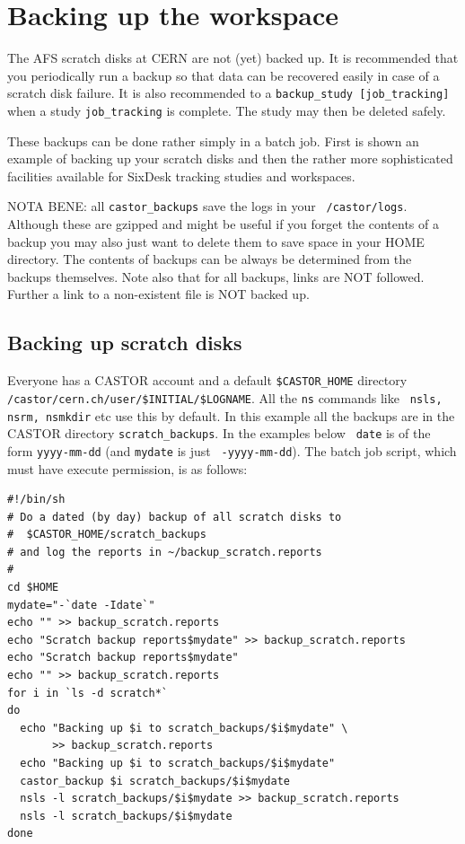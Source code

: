\documentclass{cernatsnote}
\begin{document}
\section{Backing up the workspace}
\label{sec:backup}
The AFS scratch disks at CERN are not (yet) backed up.  It is recommended that
you periodically run a backup so that data can be recovered easily in case of a
scratch disk failure. It is also recommended to a {\tt backup\_study
[job\_tracking]} when a study {\tt job\_tracking} is complete.
The study may then be deleted safely.

These backups can be done rather simply in a batch job. First is shown an
example of backing up your scratch disks and then the rather more sophisticated
facilities available for SixDesk tracking studies and workspaces.

NOTA BENE: all {\tt castor\_backups} save the logs in your {\tt ~/castor/logs}.
Although these are gzipped and might be useful if you forget the contents of a
backup you may also just want to delete them to save space in your HOME
directory.  The contents of backups can be always be determined from the
backups themselves. Note also that for all backups, links are NOT followed.
Further a link to a non-existent file is NOT backed up.

\subsection{Backing up scratch disks}
Everyone has a CASTOR account and a default {\tt \$CASTOR\_HOME} directory {\tt
/castor/cern.ch/user/\$INITIAL/\$LOGNAME}. All the {\tt ns} commands like {\tt
nsls, nsrm, nsmkdir} etc use this by default. In this example all the backups
are in the CASTOR directory {\tt scratch\_backups}.  In the examples below {\tt
date} is of the form {\tt yyyy-mm-dd} (and {\tt mydate} is just {\tt
-yyyy-mm-dd}).  The batch job script, which must have execute permission, is as
follows:
\begin{verbatim}
#!/bin/sh
# Do a dated (by day) backup of all scratch disks to 
#  $CASTOR_HOME/scratch_backups
# and log the reports in ~/backup_scratch.reports
#
cd $HOME
mydate="-`date -Idate`"
echo "" >> backup_scratch.reports
echo "Scratch backup reports$mydate" >> backup_scratch.reports
echo "Scratch backup reports$mydate"
echo "" >> backup_scratch.reports
for i in `ls -d scratch*`
do
  echo "Backing up $i to scratch_backups/$i$mydate" \
       >> backup_scratch.reports
  echo "Backing up $i to scratch_backups/$i$mydate"
  castor_backup $i scratch_backups/$i$mydate
  nsls -l scratch_backups/$i$mydate >> backup_scratch.reports
  nsls -l scratch_backups/$i$mydate
done
\end{verbatim}
\end{document}
